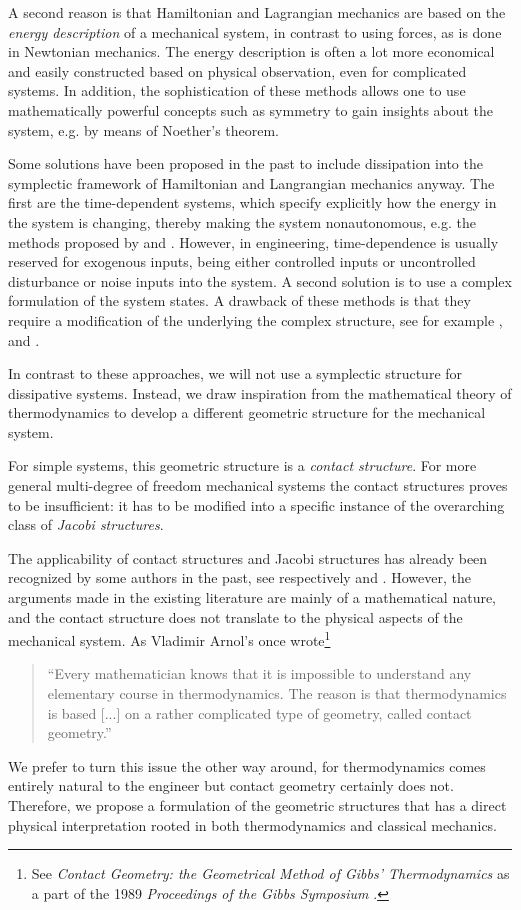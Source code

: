A second reason is that Hamiltonian and Lagrangian mechanics are based on the \emph{energy description} of a mechanical system, in contrast to using forces, as is done in Newtonian mechanics. The energy description is often a lot more economical and easily constructed based on physical observation, even for complicated systems. In addition, the sophistication of these methods allows one to use mathematically powerful concepts such as symmetry to gain insights about the system, e.g. by means of Noether's theorem.

Some solutions have been proposed in the past to include dissipation into the symplectic framework of Hamiltonian and Langrangian mechanics anyway. The first are the time-dependent systems, which specify explicitly how the energy in the system is changing, thereby making the system nonautonomous, e.g. the methods proposed by \citet{Caldirola1941} and \citet{Kanai1948}. However, in engineering, time-dependence is usually reserved for exogenous inputs, being either controlled inputs or uncontrolled disturbance or noise inputs into the system. A second solution is to use a complex formulation of the system states. A drawback of these methods is that they require a modification of the underlying the complex structure, see for example \citet{Hutters2020}, \citet{Dedene1980} and \citet{Rajeev2007}.

In contrast to these approaches, we will not use a symplectic structure for dissipative systems. Instead, we draw inspiration from the mathematical theory of thermodynamics to develop a different geometric structure for the mechanical system.

For simple systems, this geometric structure is a \emph{contact structure}. For more general multi-degree of freedom mechanical systems the contact structures proves to be insufficient: it has to be modified into a specific instance of the overarching class of \emph{Jacobi structures}. 

The applicability of contact structures and Jacobi structures has already been recognized by some authors in the past, see respectively \citet{Bravetti2017} and \citet{ciaglia2018}. However, the arguments made in the existing literature are mainly of a mathematical nature, and the contact structure does not translate to the physical aspects of the mechanical system. As Vladimir Arnol's once wrote\footnote{See \emph{Contact Geometry: the Geometrical Method of Gibbs' Thermodynamics} as a part of the 1989 \emph{Proceedings of the Gibbs Symposium} \cite[p. 163]{Arnold1989b}.}
\begin{quote}
``Every mathematician knows that it is impossible to understand any elementary course in thermodynamics. The reason is that thermodynamics is based [...] on a rather complicated type of geometry, called contact geometry.''
\end{quote}
We prefer to turn this issue the other way around, for thermodynamics comes entirely natural to the engineer but contact geometry certainly does not. Therefore, we propose a formulation of the geometric structures that has a direct physical interpretation rooted in both thermodynamics and classical mechanics.


